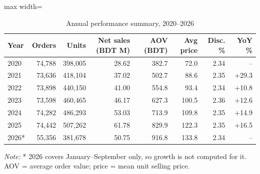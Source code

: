 \begin{table}[htbp]
\centering
\small
\caption{Annual performance summary, 2020--2026}
\label{tab:annual}
\begin{adjustbox}{max width=\linewidth}
\begin{tabular}{lrrrrrrr}
\toprule
\textbf{Year} & \textbf{Orders} & \textbf{Units} & \textbf{Net sales (BDT M)} & \textbf{AOV (BDT)} & \textbf{Avg price} & \textbf{Disc. \%} & \textbf{YoY \%} \\
\midrule
2020 & 74,788 & 398,005 & 28.62 & 382.7 & 72.0 & 2.34 & -- \\
2021 & 73,636 & 418,104 & 37.02 & 502.7 & 88.6 & 2.35 & +29.3 \\
2022 & 73,898 & 440,150 & 41.00 & 554.8 & 93.4 & 2.34 & +10.8 \\
2023 & 73,598 & 460,465 & 46.17 & 627.3 & 100.5 & 2.36 & +12.6 \\
2024 & 74,282 & 486,293 & 53.03 & 713.9 & 109.8 & 2.35 & +14.9 \\
2025 & 74,442 & 507,262 & 61.78 & 829.9 & 122.3 & 2.35 & +16.5 \\
2026* & 55,356 & 381,678 & 50.75 & 916.8 & 133.8 & 2.34 & -- \\
\bottomrule
\end{tabular}
\end{adjustbox}
\par\smallskip\parbox{0.92\linewidth}{\footnotesize\emph{Note:} * 2026 covers January--September only, so growth is not computed for it. AOV = average order value; price = mean unit selling price.}
\end{table}